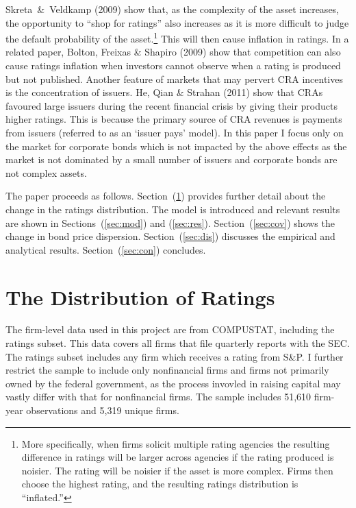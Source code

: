 \documentclass[notitlepage]{article}
\begin{document}
Skreta~\&~Veldkamp (2009) show that, as the complexity of the asset increases, the opportunity to ``shop for ratings'' also increases as it is more difficult to judge the default probability of the asset.\footnote{More specifically, when firms solicit multiple rating agencies the resulting difference in ratings will be larger across agencies if the rating produced is noisier. The rating will be noisier if the asset is more complex. Firms then choose the highest rating, and the resulting ratings distribution is ``inflated.''} This will then cause inflation in ratings. In a related paper, Bolton, Freixas \& Shapiro (2009) show that competition can also cause ratings inflation when investors cannot observe when a rating is produced but not published. Another feature of markets that may pervert CRA incentives is the concentration of issuers. He, Qian \& Strahan (2011) show that CRAs favoured large issuers during the recent financial crisis by giving their products higher ratings. This is because the primary source of CRA revenues is payments from issuers (referred to as an `issuer pays' model). In this paper I focus only on the market for corporate bonds which is not impacted by the above effects as the market is not dominated by a small number of issuers and corporate bonds are not complex assets. 

The paper proceeds as follows. Section~(\ref{sec:rat}) provides further detail about the change in the ratings distribution. The model is introduced and relevant results are shown in Sections~(\ref{sec:mod}) and (\ref{sec:res}). Section~(\ref{sec:cov}) shows the change in bond price dispersion. Section~(\ref{sec:dis}) discusses the empirical and analytical results. Section~(\ref{sec:con}) concludes.

\section{The Distribution of Ratings}
\label{sec:rat}
The firm-level data used in this project are from COMPUSTAT, including the ratings subset. This data covers all firms that file quarterly reports with the SEC. The ratings subset includes any firm which receives a rating from S\&P. I further restrict the sample to include only nonfinancial firms and firms not primarily owned by the federal government, as the process invovled in raising capital may vastly differ with that for nonfinancial firms. The sample includes 51,610 firm-year observations and 5,319 unique firms. 
\end{document}
